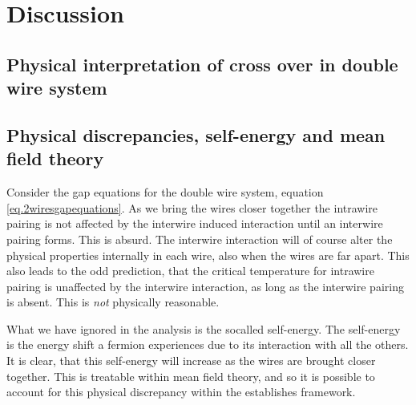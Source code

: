 \chapter{Discussion} %

\label{Chapter13} %

\section{Physical interpretation of cross over in double wire system} \label{sec.Discussion.2wires.crossover}


\section{Physical discrepancies, self-energy and mean field theory} \label{sec.Discussion.physicaldiscrepancies}
Consider the gap equations for the double wire system, equation \eqref{eq.2wiresgapequations}. As we bring the wires closer together the intrawire pairing is not affected by the interwire induced interaction until an interwire pairing forms. This is absurd. The interwire interaction will of course alter the physical properties internally in each wire, also when the wires are far apart. This also leads to the odd prediction, that the critical temperature for intrawire pairing is unaffected by the interwire interaction, as long as the interwire pairing is absent. This is \textit{not} physically reasonable. 

What we have ignored in the analysis is the socalled self-energy. The self-energy is the energy shift a fermion experiences due to its interaction with all the others. It is clear, that this self-energy will increase as the wires are brought closer together. This is treatable within mean field theory, and so it is possible to account for this physical discrepancy within the establishes framework. 

